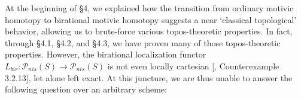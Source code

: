 At the beginning of \S4, we explained how the transition from ordinary motivic homotopy to birational motivic homotopy suggests a near `classical topological' behavior, allowing us to brute-force various topos-theoretic properties. In fact, through \S4.1, \S4.2, and \S4.3, we have proven many of those topos-theoretic properties. However, the birational localization functor $L_{bir}: \mathcal{P}_{nis}(S)\to \mathcal{P}_{nis}(S)$ is not even locally cartesian [\cite{0bat}, Counterexample 3.2.13], let alone left exact. At this juncture, we are thus unable to answer the following question over an arbitrary scheme: 

